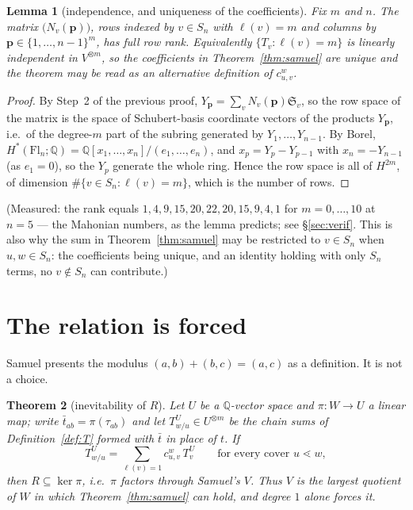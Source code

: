 \documentclass[11pt]{article}
\theoremstyle{plain}
\newtheorem{theorem}{Theorem}
\newtheorem{lemma}[theorem]{Lemma}
\theoremstyle{definition}
\newcommand{\Sch}{\mathfrak{S}}
\newcommand{\Fl}{\mathrm{Fl}}
\DeclareMathOperator{\len}{\ell}
\begin{document}
\begin{lemma}[independence, and uniqueness of the coefficients]\label{lem:indep}
Fix $m$ and $n$. The matrix $\bigl(N_{v}(\mathbf{p})\bigr)$, rows indexed by
$v\in S_{n}$ with $\len(v)=m$ and columns by
$\mathbf{p}\in\{1,\dots,n-1\}^{m}$, has full row rank. Equivalently
$\{T_{v}:\len(v)=m\}$ is linearly independent in $V^{\otimes m}$, so the
coefficients in Theorem~\ref{thm:samuel} are unique and the theorem may be read
as an alternative \emph{definition} of $c^{w}_{u,v}$.
\end{lemma}

\begin{proof}
By Step~2 of the previous proof, $Y_{\mathbf{p}}=\sum_{v}N_{v}(\mathbf{p})\Sch_{v}$,
so the row space of the matrix is the space of Schubert-basis coordinate
vectors of the products $Y_{\mathbf{p}}$, i.e.\ of the degree-$m$ part of the
subring generated by $Y_{1},\dots,Y_{n-1}$. By Borel,
$H^{*}(\Fl_{n};\mathbb{Q})=\mathbb{Q}[x_{1},\dots,x_{n}]/(e_{1},\dots,e_{n})$,
and $x_{p}=Y_{p}-Y_{p-1}$ with $x_{n}=-Y_{n-1}$ (as $e_{1}=0$), so the $Y_{p}$
generate the whole ring. Hence the row space is all of $H^{2m}$, of dimension
$\#\{v\in S_{n}:\len(v)=m\}$, which is the number of rows.
\end{proof}

\noindent (Measured: the rank equals $1,4,9,15,20,22,20,15,9,4,1$ for
$m=0,\dots,10$ at $n=5$ --- the Mahonian numbers, as the lemma predicts;
see \S\ref{sec:verif}. This is also why the sum in Theorem~\ref{thm:samuel} may
be restricted to $v\in S_{n}$ when $u,w\in S_{n}$: the coefficients being
unique, and an identity holding with only $S_{n}$ terms, no $v\notin S_{n}$ can
contribute.)

\section{The relation is forced}

Samuel presents the modulus $(a,b)+(b,c)=(a,c)$ as a definition. It is not a
choice.

\begin{theorem}[inevitability of $R$]\label{thm:forced}
Let $U$ be a $\mathbb{Q}$-vector space and $\pi:W\to U$ a linear map; write
$\bar{t}_{ab}=\pi(\tau_{ab})$ and let $T^{U}_{w/u}\in U^{\otimes m}$ be the
chain sums of Definition~\ref{def:T} formed with $\bar{t}$ in place of $t$.
If
\[
  T^{U}_{w/u}=\sum_{\len(v)=1}c^{w}_{u,v}\,T^{U}_{v}
  \qquad\text{for every cover }u\lessdot w,
\]
then $R\subseteq\ker\pi$, i.e.\ $\pi$ factors through Samuel's $V$. Thus $V$ is
the largest quotient of $W$ in which Theorem~\ref{thm:samuel} can hold, and
degree $1$ alone forces it.
\end{theorem}
\end{document}
